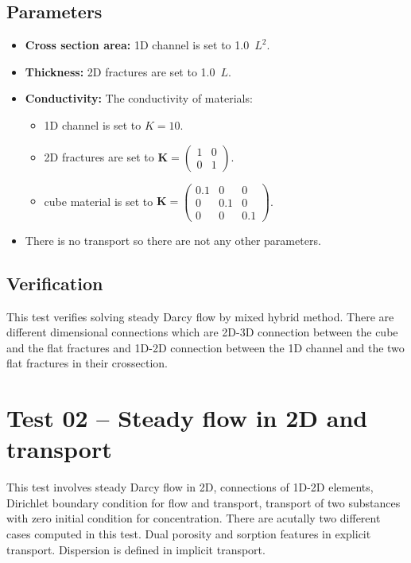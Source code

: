 \subsection*{Parameters}
\begin{itemize}
  \item \textbf{Cross section area:} 1D channel is set to 1.0~$L^2$.
  \item \textbf{Thickness:} 2D fractures are set to 1.0~$L$.
  \item \textbf{Conductivity:} The conductivity of materials:
    \begin{itemize}
      \item 1D channel is set to $K=10$.
      \item 2D fractures are set to $\mathbf{K}=\left(\begin{array}{cc} 1 & 0 \\ 0 & 1\end{array} \right)$.
      \item cube material is set to $\mathbf{K}=\left(\begin{array}{ccc} 0.1 & 0 & 0 \\ 0 & 0.1 & 0 \\ 0 & 0 & 0.1\end{array} \right)$.
    \end{itemize}
  \item There is no transport so there are not any other parameters.
\end{itemize}

\subsection*{Verification}
This test verifies solving steady Darcy flow by mixed hybrid method. There are different dimensional connections which are 2D-3D connection between the cube and the flat fractures and 1D-2D connection between the 1D channel and the two flat fractures in their crossection.





\section{Test 02 -- Steady flow in 2D and transport}
\label{sec:test02}
This test involves steady Darcy flow in 2D, connections of 1D-2D elements, Dirichlet boundary condition for flow and transport, transport of two substances with zero initial condition for concentration. There are acutally two different cases computed in this test. Dual porosity and sorption features in explicit transport. Dispersion is defined in implicit transport.

